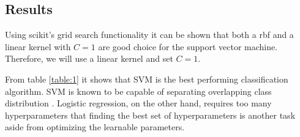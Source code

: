 \subsection{Results} \label{subsec:results_logistic_regression}
Using scikit's grid search functionality it can be shown that both a rbf and a linear kernel with $C=1$ are good choice for the support vector machine. Therefore, we will use a linear kernel and set $C=1$. 


From table \ref{table:1} it shows that SVM is the best performing classification algorithm. SVM is known to be capable of separating overlapping class distribution \cite{bishop2006pattern}. Logistic regression, on the other hand, requires too many hyperparameters that finding the best set of hyperparameters is another task aside from optimizing the learnable parameters.



